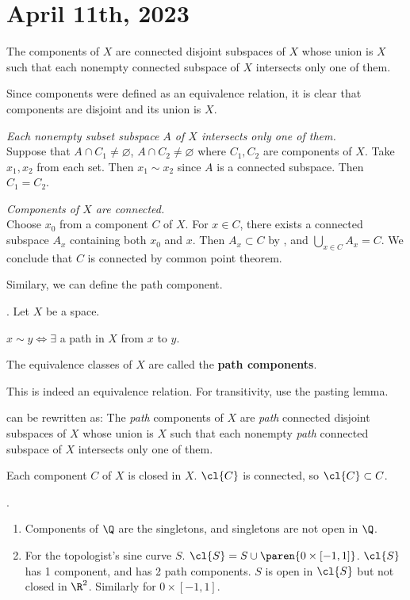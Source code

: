 \section*{April 11th, 2023}

 The components of \(X\) are connected disjoint subspaces of \(X\) whose union is \(X\) such that each nonempty connected subspace of \(X\) intersects only one of them.

\pf Since components were defined as an equivalence relation, it is clear that components are disjoint and its union is \(X\).

 \textit{Each nonempty subset subspace \(A\) of \(X\) intersects only one of them.} \\
Suppose that \(A \cap C_1 \neq \varnothing\), \(A \cap C_2 \neq \varnothing\) where \(C_1, C_2\) are components of \(X\). Take \(x_1, x_2\) from each set. Then \(x_1 \sim x_2\) since \(A\) is a connected subspace. Then \(C_1 = C_2\).

 \textit{Components of \(X\) are connected.} \\
Choose \(x_0\) from a component \(C\) of \(X\). For \(x \in C\), there exists a connected subspace \(A_x\) containing both \(x_0\) and \(x\). Then \(A_x \subset C\) by , and \(\bigcup_{x \in C} A_x = C\). We conclude that \(C\) is connected by common point theorem.

Similary, we can define the path component.

.  Let \(X\) be a space.
\begin{center}
    \(x \sim y \iff \exists\) a path in \(X\) from \(x\) to \(y\).
\end{center}
The equivalence classes of \(X\) are called the \textbf{path components}.

\rmk This is indeed an equivalence relation. For transitivity, use the pasting lemma.

\rmk {} can be rewritten as:
The \textit{path} components of \(X\) are \textit{path} connected disjoint subspaces of \(X\) whose union is \(X\) such that each nonempty \textit{path} connected subspace of \(X\) intersects only one of them.

\rmk Each component \(C\) of \(X\) is closed in \(X\). \(\cl{C}\) is connected, so \(\cl{C} \subset C\).

\ex.
\begin{enumerate}
    \item Components of \(\Q\) are the singletons, and singletons are not open in \(\Q\).
    \item For the topologist's sine curve \(S\). \(\cl{S} = S \cup \paren{0 \times [-1, 1]}\). \(\cl{S}\) has 1 component, and has 2 path components. \(S\) is open in \(\cl{S}\) but not closed in \(\R^2\). Similarly for \(0 \times [-1, 1]\).
\end{enumerate}


